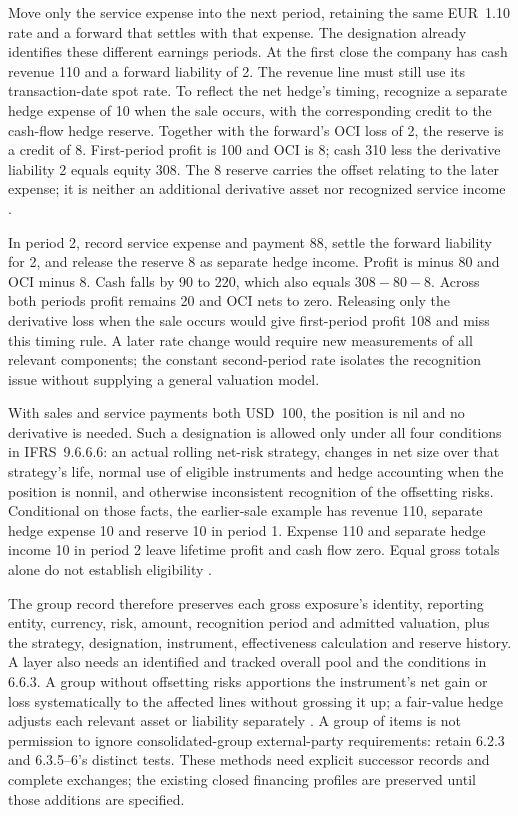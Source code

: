 Move only the service expense into the next period, retaining the same
EUR~1.10 rate and a forward that settles with that expense. The designation
already identifies these different earnings periods. At the first close the
company has cash revenue 110 and a forward liability of 2. The revenue line
must still use its transaction-date spot rate. To reflect the net hedge's
timing, recognize a separate hedge expense of 10 when the sale occurs, with
the corresponding credit to the cash-flow hedge reserve. Together with the
forward's OCI loss of 2, the reserve is a credit of 8. First-period profit is
100 and OCI is 8; cash 310 less the derivative liability 2 equals equity 308.
The 8 reserve carries the offset relating to the later expense; it is neither
an additional derivative asset nor recognized service income
\citep[IFRS~9.B6.6.9, B6.6.15]{eu20231803}.

In period 2, record service expense and payment 88, settle the forward
liability for 2, and release the reserve 8 as separate hedge income. Profit
is minus 80 and OCI minus 8. Cash falls by 90 to 220, which also equals
$308-80-8$. Across both periods profit remains 20 and OCI nets to zero.
Releasing only the derivative loss when the sale occurs would give first-period
profit 108 and miss this timing rule. A later rate change would require new
measurements of all relevant components; the constant second-period rate
isolates the recognition issue without supplying a general valuation model.

With sales and service payments both USD~100, the position is nil and no
derivative is needed. Such a designation is allowed only under all four
conditions in IFRS~9.6.6.6: an actual rolling net-risk strategy, changes in net
size over that strategy's life, normal use of eligible instruments and hedge
accounting when the position is nonnil, and otherwise inconsistent recognition
of the offsetting risks. Conditional on those facts, the earlier-sale example
has revenue 110, separate hedge expense 10 and reserve 10 in period 1.
Expense 110 and separate hedge income 10 in period 2 leave lifetime profit
and cash flow zero. Equal gross totals alone do not establish eligibility
\citep[IFRS~9.6.6.6, B6.6.3, B6.6.6, B6.6.10]{eu20231803}.

The group record therefore preserves each gross exposure's identity, reporting
entity, currency, risk, amount, recognition period and admitted valuation, plus
the strategy, designation, instrument, effectiveness calculation and reserve
history. A layer also needs an identified and tracked overall pool and the
conditions in 6.6.3. A group without offsetting risks apportions the instrument's
net gain or loss systematically to the affected lines without grossing it up;
a fair-value hedge adjusts each relevant asset or liability separately
\citep[IFRS~9.6.6.3--5, B6.6.11--16]{eu20231803}. A group of items is not
permission to ignore consolidated-group external-party requirements: retain
6.2.3 and 6.3.5--6's distinct tests. These methods need explicit successor
records and complete exchanges; the existing closed financing profiles are
preserved until those additions are specified.
